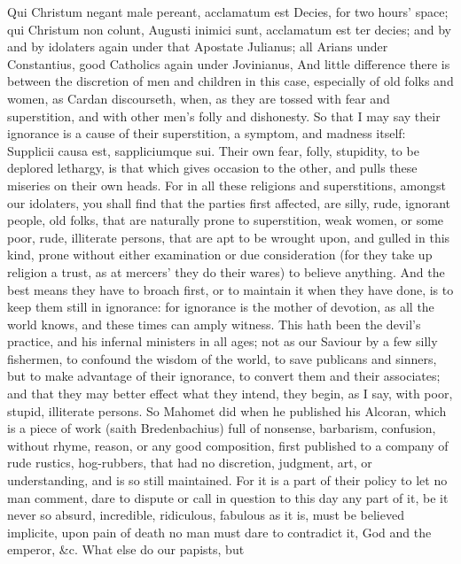 {Qui Christum negant male pereant, acclamatum est Decies, for two
hours' space; qui Christum non colunt, Augusti inimici sunt, acclamatum
est ter decies; and by and by idolaters again under that Apostate
Julianus; all Arians under Constantius, good Catholics again under
Jovinianus, And little difference there is between the discretion of
men and children in this case, especially of old folks and women, as
 Cardan discourseth, when, as they are tossed with fear and
superstition, and with other men's folly and dishonesty. So that I may
say their ignorance is a cause of their superstition, a symptom, and
madness itself: Supplicii causa est, sappliciumque sui. Their own fear,
folly, stupidity, to be deplored lethargy, is that which gives occasion
to the other, and pulls these miseries on their own heads. For in all
these religions and superstitions, amongst our idolaters, you shall
find that the parties first affected, are silly, rude, ignorant people,
old folks, that are naturally prone to superstition, weak women, or
some poor, rude, illiterate persons, that are apt to be wrought upon,
and gulled in this kind, prone without either examination or due
consideration (for they take up religion a trust, as at mercers' they
do their wares) to believe anything. And the best means they have to
broach first, or to maintain it when they have done, is to keep them
still in ignorance: for ignorance is the mother of devotion, as all the
world knows, and these times can amply witness. This hath been the
devil's practice, and his infernal ministers in all ages; not as our
Saviour by a few silly fishermen, to confound the wisdom of the world,
to save publicans and sinners, but to make advantage of their
ignorance, to convert them and their associates; and that they may
better effect what they intend, they begin, as I say, with poor,
stupid, illiterate persons. So Mahomet did when he published his
Alcoran, which is a piece of work (saith Bredenbachius) full of
nonsense, barbarism, confusion, without rhyme, reason, or any good
composition, first published to a company of rude rustics, hog-rubbers,
that had no discretion, judgment, art, or understanding, and is so
still maintained. For it is a part of their policy to let no man
comment, dare to dispute or call in question to this day any part of
it, be it never so absurd, incredible, ridiculous, fabulous as it is,
must be believed implicite, upon pain of death no man must dare to
contradict it, God and the emperor, \&c. What else do our papists, but
}
